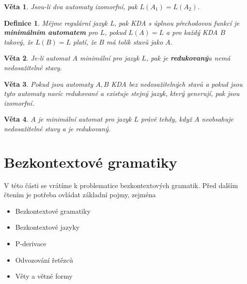 \documentclass[10pt, a4paper, titlepage]{article}
\theoremstyle{note}
\newtheorem{veta}{\textbf{Věta}}
\newtheorem{definice}{\textbf{Definice}}
\begin{document}
\begin{veta}
Jsou-li dva automaty izomorfní, pak $L(A_1) = L(A_2)$.
\end{veta}

\begin{definice}
Mějme regulární jazyk L, pak KDA s úplnou přechodovou funkcí je \textbf{minimálním automatem} pro $L$,
pokud $L(A) = L$ a pro každý KDA $B$ takový, že $L(B) = L$ platí, že $B$ má tolik stavů jako $A$.
\end{definice}

\begin{veta}
Je-li automat $A$ minimální pro jazyk $L$, pak je \textbf{redukovaný}a nemá nedosažitelné stavy.
\end{veta}

\begin{veta}
Pokud jsou automaty $A, B$ KDA bez nedosažitelných stavů a pokud jsou tyto automaty navíc redukované a
existuje stejný jazyk, který generují, pak jsou izomorfní.
\end{veta}

\begin{veta}
$A$ je minimální automat pro jazyk $L$ právě tehdy, když $A$ neobsahuje nedosažitelné stavy a je redukovaný.
\end{veta}


\section{Bezkontextové gramatiky}
V této části se vrátíme k problematice bezkontextových gramatik. Před dalším čtením je potřeba ovládat základní pojmy, zejména
\begin{itemize}
\item
Bezkontextové gramatiky
\item
Bezkontextové jazyky
\item
P-derivace
\item
Odvozování řetězců
\item
Věty a větné formy

\end{itemize}
\end{document}
